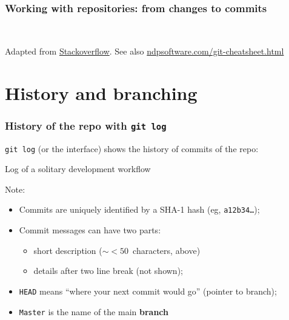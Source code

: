 \documentclass[10pt,svgnames]{beamer}
\begin{document}
\begin{frame}
\frametitle{Working with repositories: from changes to commits}
\\
\begin{small}
Adapted from \href{https://tex.stackexchange.com/a/70332/14260}{Stackoverflow}. See also \href{http://ndpsoftware.com/git-cheatsheet.html}{ndpsoftware.com/git-cheatsheet.html}
\end{small}

\end{frame}



\section{History and branching}

\begin{frame}
\frametitle{History of the repo with \lstinline{git log}}

\lstinline{git log} (or the interface) shows the history of commits of the repo: \pause

\begin{block}{Log of a solitary development workflow}

\end{block}
\smallskip
\pause
Note:
\begin{itemize}
  \item Commits are uniquely identified by a SHA-1 hash (eg, \texttt{a12b34\ldots});
  \item Commit messages can have two parts:
  \begin{itemize}
    \item short description ($\sim<50$~characters, above)
    \item details after two line break (not shown);
  \end{itemize}
  \item \lstinline{HEAD} means “where your next commit would go” (pointer to branch);
  \item \lstinline{Master} is the name of the main \textbf{branch}
\end{itemize}
\end{frame}
\end{document}
